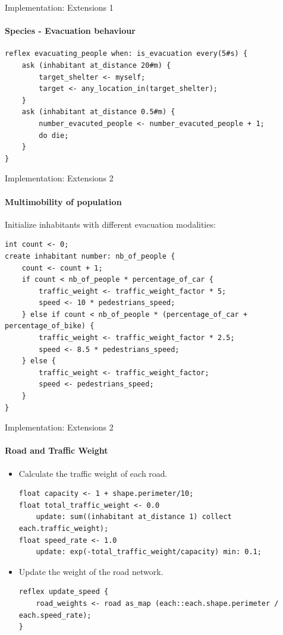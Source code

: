 \documentclass{beamer}
\begin{document}
\begin{frame}[fragile]{Implementation: Extensions 1}
\framesubtitle{Species - Evacuation behaviour}

\begin{lstlisting}[style=GAML]
reflex evacuating_people when: is_evacuation every(5#s) {
    ask (inhabitant at_distance 20#m) {
        target_shelter <- myself;
        target <- any_location_in(target_shelter);
    }
    ask (inhabitant at_distance 0.5#m) {
        number_evacuted_people <- number_evacuted_people + 1;
        do die;
    }
}
\end{lstlisting}


\end{frame}


\begin{frame}[fragile]{Implementation: Extensions 2}
\framesubtitle{Multimobility of population}

Initialize inhabitants with different evacuation modalities:
\begin{lstlisting}[style=GAML]
int count <- 0;
create inhabitant number: nb_of_people {
    count <- count + 1;
    if count < nb_of_people * percentage_of_car {
        traffic_weight <- traffic_weight_factor * 5;
        speed <- 10 * pedestrians_speed;
    } else if count < nb_of_people * (percentage_of_car + percentage_of_bike) {
        traffic_weight <- traffic_weight_factor * 2.5;
        speed <- 8.5 * pedestrians_speed;
    } else {
        traffic_weight <- traffic_weight_factor;
        speed <- pedestrians_speed;
    }
}
\end{lstlisting}

\end{frame}

\begin{frame}[fragile]{Implementation: Extensions 2}
\framesubtitle{Road and Traffic Weight}

\begin{itemize}
    \item Calculate the traffic weight of each road.

    \begin{lstlisting}[style=GAML]
float capacity <- 1 + shape.perimeter/10;
float total_traffic_weight <- 0.0 
    update: sum((inhabitant at_distance 1) collect each.traffic_weight);
float speed_rate <- 1.0 
    update: exp(-total_traffic_weight/capacity) min: 0.1;
\end{lstlisting}

    \item Update the weight of the road network.

\begin{lstlisting}[style=GAML]
reflex update_speed { 
    road_weights <- road as_map (each::each.shape.perimeter / each.speed_rate);
}
\end{lstlisting}
\end{itemize}
\end{frame}
\end{document}
